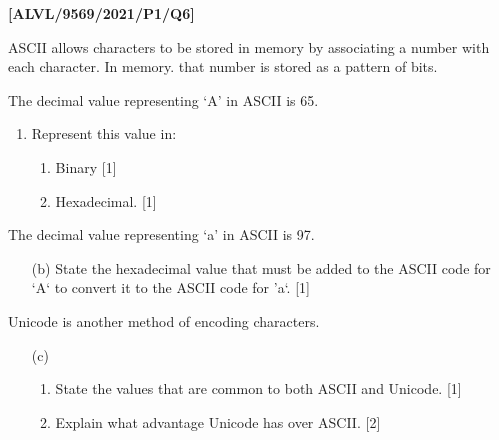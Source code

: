 \item \textbf{{[}ALVL/9569/2021/P1/Q6{]} }

ASCII allows characters to be stored in memory by associating a number
with each character. In memory. that number is stored as a pattern
of bits. 

The decimal value representing \textquoteleft A\textquoteright{} in
ASCII is 65. 
\begin{enumerate}
\item Represent this value in:
\begin{enumerate}
\item Binary \hfill{}{[}1{]}
\item Hexadecimal. \hfill{}{[}1{]}
\end{enumerate}
\end{enumerate}
The decimal value representing \textquoteleft a\textquoteright{} in
ASCII is 97. 
\begin{enumerate}
\item[(b)]  State the hexadecimal value that must be added to the ASCII code
for \textquoteleft A\textquoteleft{} to convert it to the ASCII code
for 'a\textquoteleft . \hfill{}{[}1{]}
\end{enumerate}
Unicode is another method of encoding characters.
\begin{enumerate}
\item[(c)]  {}
\begin{enumerate}
\item State the values that are common to both ASCII and Unicode.\hfill{}
{[}1{]}
\item Explain what advantage Unicode has over ASCII. \hfill{}{[}2{]}
\end{enumerate}
\end{enumerate}